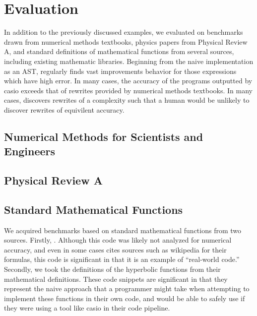 \documentclass[paper.tex]{subfiles}
\begin{document}
\section{Evaluation}


In addition to the previously discussed examples,
we evaluated \casio on benchmarks drawn from
numerical methods textbooks,
physics papers from Physical Review A,
and standard definitions of mathematical functions from several sources,
including existing mathematic libraries.
Beginning from the naive implementation as an AST,
\casio regularly finds vast improvements behavior for those expressions which have high error.
In many cases, the accuracy of the programs outputted by casio 
exceeds that of rewrites provided by numerical methods textbooks.
In many cases, \casio discovers rewrites of a complexity 
such that a human would be unlikely to discover rewrites of equivilent accuracy.

\subsection{Numerical Methods for Scientists and Engineers}

\subsection{Physical Review A}

\subsection{Standard Mathematical Functions}

We acquired benchmarks based on standard mathematical functions from two sources.
Firstly, .
Although this code was likely not analyzed for numerical accuracy,
and even in some cases cites sources such as wikipedia for their formulas,
this code is significant in that it is an example of ``real-world code.''
Secondly, we took the definitions of the hyperbolic functions from their mathematical definitions.
These code snippets are significant in that
they represent the naive approach that a programmer might take
when attempting to implement these functions in their own code,
and would be able to safely use if they were using a tool like casio
in their code pipeline.
\end{document}
